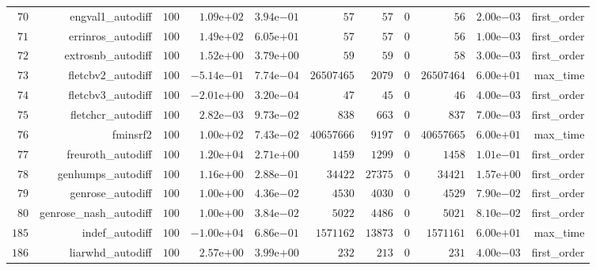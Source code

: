 \documentclass[varwidth=20cm,crop=true]{standalone}
\begin{document}
\begin{longtable}{rrrrrrrrrrr}
  \(    70\) & engval1\_autodiff & \(   100\) & \( 1.09\)e\(+02\) & \( 3.94\)e\(-01\) & \(    57\) & \(    57\) & \(     0\) & \(    56\) & \( 2.00\)e\(-03\) & first\_order \\
  \(    71\) & errinros\_autodiff & \(   100\) & \( 1.49\)e\(+02\) & \( 6.05\)e\(+01\) & \(    57\) & \(    57\) & \(     0\) & \(    56\) & \( 1.00\)e\(-03\) & first\_order \\
  \(    72\) & extrosnb\_autodiff & \(   100\) & \( 1.52\)e\(+00\) & \( 3.79\)e\(+00\) & \(    59\) & \(    59\) & \(     0\) & \(    58\) & \( 3.00\)e\(-03\) & first\_order \\
  \(    73\) & fletcbv2\_autodiff & \(   100\) & \(-5.14\)e\(-01\) & \( 7.74\)e\(-04\) & \(26507465\) & \(  2079\) & \(     0\) & \(26507464\) & \( 6.00\)e\(+01\) & max\_time \\
  \(    74\) & fletcbv3\_autodiff & \(   100\) & \(-2.01\)e\(+00\) & \( 3.20\)e\(-04\) & \(    47\) & \(    45\) & \(     0\) & \(    46\) & \( 4.00\)e\(-03\) & first\_order \\
  \(    75\) & fletchcr\_autodiff & \(   100\) & \( 2.82\)e\(-03\) & \( 9.73\)e\(-02\) & \(   838\) & \(   663\) & \(     0\) & \(   837\) & \( 7.00\)e\(-03\) & first\_order \\
  \(    76\) & fminsrf2 & \(   100\) & \( 1.00\)e\(+02\) & \( 7.43\)e\(-02\) & \(40657666\) & \(  9197\) & \(     0\) & \(40657665\) & \( 6.00\)e\(+01\) & max\_time \\
  \(    77\) & freuroth\_autodiff & \(   100\) & \( 1.20\)e\(+04\) & \( 2.71\)e\(+00\) & \(  1459\) & \(  1299\) & \(     0\) & \(  1458\) & \( 1.01\)e\(-01\) & first\_order \\
  \(    78\) & genhumps\_autodiff & \(   100\) & \( 1.16\)e\(+00\) & \( 2.88\)e\(-01\) & \( 34422\) & \( 27375\) & \(     0\) & \( 34421\) & \( 1.57\)e\(+00\) & first\_order \\
  \(    79\) & genrose\_autodiff & \(   100\) & \( 1.00\)e\(+00\) & \( 4.36\)e\(-02\) & \(  4530\) & \(  4030\) & \(     0\) & \(  4529\) & \( 7.90\)e\(-02\) & first\_order \\
  \(    80\) & genrose\_nash\_autodiff & \(   100\) & \( 1.00\)e\(+00\) & \( 3.84\)e\(-02\) & \(  5022\) & \(  4486\) & \(     0\) & \(  5021\) & \( 8.10\)e\(-02\) & first\_order \\
  \(   185\) & indef\_autodiff & \(   100\) & \(-1.00\)e\(+04\) & \( 6.86\)e\(-01\) & \(1571162\) & \( 13873\) & \(     0\) & \(1571161\) & \( 6.00\)e\(+01\) & max\_time \\
  \(   186\) & liarwhd\_autodiff & \(   100\) & \( 2.57\)e\(+00\) & \( 3.99\)e\(+00\) & \(   232\) & \(   213\) & \(     0\) & \(   231\) & \( 4.00\)e\(-03\) & first\_order \\

\end{longtable}
\end{document}
